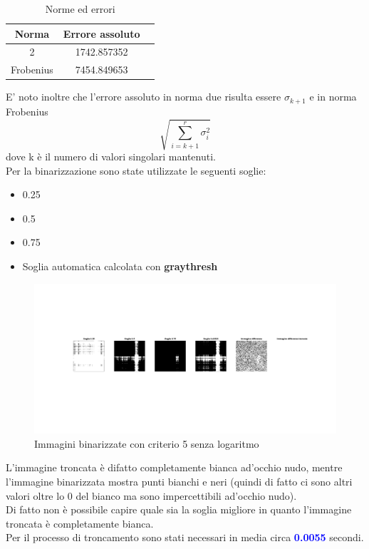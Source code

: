 \begin{table}[H]
    \centering
    \begin{tabular}{|c|c|c|}
        \hline
        \textbf{Norma} & \textbf{Errore assoluto} \\
        \hline
        2 & 1742.857352  \\
        \hline
        Frobenius & 7454.849653 \\
        \hline
    \end{tabular}
    \caption{Norme ed errori}
\end{table}

\noindent
E' noto inoltre che l'errore assoluto in norma due risulta essere $\sigma_{k+1}$ e in norma Frobenius 
\begin{equation}
    \sqrt{\sum_{i=k+1}^{r}\sigma_i^2}
\end{equation}
 dove k è il numero di valori singolari mantenuti.\\
Per la binarizzazione sono state utilizzate le seguenti soglie:
\begin{itemize}
    \item 0.25
    \item 0.5
    \item 0.75
    \item Soglia automatica calcolata con \textbf{graythresh}
\end{itemize}

\begin{figure}[H]
    \centering
     \includegraphics[width=\textwidth]{images/Criterio5_2.jpg}
    \caption{Immagini binarizzate con criterio 5 senza logaritmo}
\end{figure}

\noindent L'immagine troncata è difatto completamente bianca ad'occhio nudo, mentre l'immagine binarizzata mostra punti bianchi e neri (quindi di fatto ci sono altri valori oltre lo 0 del bianco ma sono impercettibili ad'occhio nudo).\\
Di fatto non è possibile capire quale sia la soglia migliore in quanto l'immagine troncata è completamente bianca.\\

\noindent Per il processo di troncamento sono stati necessari in media circa \textcolor{blue}{\textbf{0.0055}} secondi.\\
